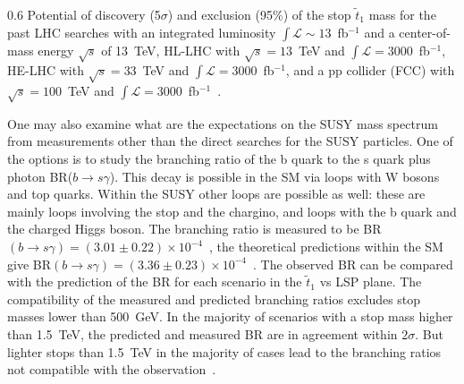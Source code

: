                  {0.6}       %
                 { Potential of discovery (5$\sigma$) and exclusion (95\%) of the stop $\tilde{t}_{1}$ mass for the past LHC searches with an integrated luminosity $\int \mathcal{L} \sim 13$~fb$^{-1}$ and a center-of-mass energy $\sqrt{s}$ of 13~TeV, HL-LHC with $\sqrt{s}= 13$~TeV and $\int \mathcal{L} = 3000$~fb$^{-1}$, HE-LHC with $\sqrt{s}= 33$~TeV and $\int \mathcal{L} = 3000$~fb$^{-1}$,  and a pp collider (FCC) with $\sqrt{s}= 100$~TeV and $\int \mathcal{L} = 3000$~fb$^{-1}$~\cite{Baer:2016bwh}.  }


One may also examine what are the expectations on the SUSY mass spectrum from measurements other than the direct searches for the SUSY particles. One of the options is to study the branching ratio of the b quark to the s quark plus photon BR($b \to s\gamma$).  This decay is possible in the SM via loops with W bosons and top quarks. Within the SUSY other loops are possible as well: these are mainly loops involving the  stop and the chargino, and loops with the b quark and the charged Higgs boson. The branching ratio is measured to be BR$(b \to s\gamma) = (3.01 \pm 0.22) \times 10^{-4}$~\cite{Belle:2016ufb}, the theoretical predictions within the SM give BR$(b \to s\gamma) = (3.36 \pm 0.23) \times 10^{-4}$~\cite{Misiak:2015xwa}. The observed BR can be compared with the prediction of the BR for each scenario in the $\tilde{t}_{1}$ vs LSP plane. The compatibility of the measured and predicted branching ratios excludes stop masses lower than 500~GeV. In the majority of scenarios with a stop mass higher than 1.5~TeV, the predicted and measured BR are in agreement within $2\sigma$. But lighter stops than 1.5~TeV in the majority of cases lead to the branching ratios not compatible with the observation~\cite{Baer:2016bwh}.

